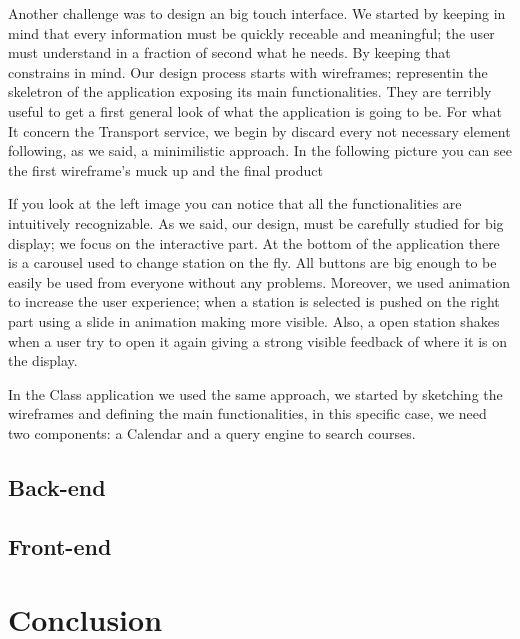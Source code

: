 \documentclass[]{usiinfbachelorproject}
\begin{document}
Another challenge was to design an big touch interface. We started by keeping in mind that every information must be quickly receable and meaningful; the user must understand in a fraction of second what he needs. By keeping that constrains in mind.
Our design process starts with wireframes; representin the skeletron of the application exposing its main functionalities. They are terribly useful to get a first general look of what the application is going to be. For what It concern the Transport service, we begin by discard every not necessary element following, as we said, a minimilistic approach. In the following picture you can see the first wireframe's muck up and the final product
\begin{figure}[H]
  \centering
  \hfill
\end{figure} 
If you look at the left image you can notice that all the functionalities are intuitively recognizable. As we said, our design, must be carefully studied for big display; we focus on the interactive part.
At the bottom of the application there is a carousel used to change station on the fly. All buttons are big enough to be easily be used from everyone without any problems.
Moreover, we used animation to increase the user experience; when a station is selected is pushed on the right part using a slide in animation making more visible. Also, a open station shakes when a user try to open it again giving a strong visible feedback of where it is on the display. 

In the Class application we used the same approach, we started by sketching the wireframes and defining the main functionalities, in this specific case, we need two components: a Calendar and a query engine to search courses.
\subsection{Back-end}
\subsection{Front-end}
\section{Conclusion}
 
\newpage





\end{document}
